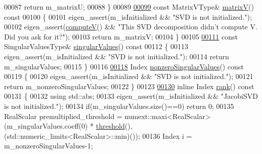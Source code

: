 \begin{DoxyCode}
00087     \textcolor{keywordflow}{return} m\_matrixU;
00088   \}
00089 
\hyperlink{group___s_v_d___module_a245a453b5e7347f737295c23133238c4}{00099}   \textcolor{keyword}{const} MatrixVType& \hyperlink{group___s_v_d___module_a245a453b5e7347f737295c23133238c4}{matrixV}()\textcolor{keyword}{ const}
00100 \textcolor{keyword}{  }\{
00101     eigen\_assert(m\_isInitialized && \textcolor{stringliteral}{"SVD is not initialized."});
00102     eigen\_assert(\hyperlink{group___s_v_d___module_a5f12efcb791eb007d4a4890ac5255ac4}{computeV}() && \textcolor{stringliteral}{"This SVD decomposition didn't compute V. Did you ask for it?"});
00103     \textcolor{keywordflow}{return} m\_matrixV;
00104   \}
00105 
\hyperlink{group___s_v_d___module_a4e7bac123570c348f7ed6be909e1e474}{00111}   \textcolor{keyword}{const} SingularValuesType& \hyperlink{group___s_v_d___module_a4e7bac123570c348f7ed6be909e1e474}{singularValues}()\textcolor{keyword}{ const}
00112 \textcolor{keyword}{  }\{
00113     eigen\_assert(m\_isInitialized && \textcolor{stringliteral}{"SVD is not initialized."});
00114     \textcolor{keywordflow}{return} m\_singularValues;
00115   \}
00116 
\hyperlink{group___s_v_d___module_afe8a555f38393a319a71ec0f0331c9ef}{00118}   Index \hyperlink{group___s_v_d___module_afe8a555f38393a319a71ec0f0331c9ef}{nonzeroSingularValues}()\textcolor{keyword}{ const}
00119 \textcolor{keyword}{  }\{
00120     eigen\_assert(m\_isInitialized && \textcolor{stringliteral}{"SVD is not initialized."});
00121     \textcolor{keywordflow}{return} m\_nonzeroSingularValues;
00122   \}
00123   
\hyperlink{group___s_v_d___module_a30b89e24f42f1692079eea31b361d26a}{00130}   \textcolor{keyword}{inline} Index \hyperlink{group___s_v_d___module_a30b89e24f42f1692079eea31b361d26a}{rank}()\textcolor{keyword}{ const}
00131 \textcolor{keyword}{  }\{
00132     \textcolor{keyword}{using} std::abs;
00133     eigen\_assert(m\_isInitialized && \textcolor{stringliteral}{"JacobiSVD is not initialized."});
00134     \textcolor{keywordflow}{if}(m\_singularValues.size()==0) \textcolor{keywordflow}{return} 0;
00135     RealScalar premultiplied\_threshold = numext::maxi<RealScalar>(m\_singularValues.coeff(0) * 
      \hyperlink{group___s_v_d___module_a98b2ee98690358951807353812a05c69}{threshold}(), (std::numeric\_limits<RealScalar>::min)());
00136     Index i = m\_nonzeroSingularValues-1;

\end{DoxyCode}
